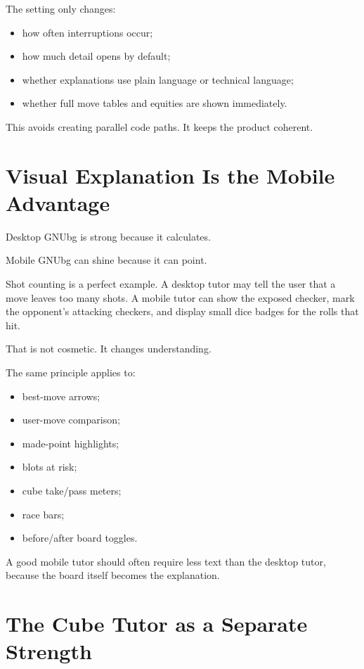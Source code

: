 \documentclass[11pt,a4paper]{article}
\begin{document}
The setting only changes:

\begin{itemize}
  \item how often interruptions occur;
  \item how much detail opens by default;
  \item whether explanations use plain language or technical language;
  \item whether full move tables and equities are shown immediately.
\end{itemize}

This avoids creating parallel code paths. It keeps the product coherent.

\section{Visual Explanation Is the Mobile Advantage}

Desktop GNUbg is strong because it calculates.

Mobile GNUbg can shine because it can point.

Shot counting is a perfect example. A desktop tutor may tell the user that a move leaves too many shots. A mobile tutor can show the exposed checker, mark the opponent's attacking checkers, and display small dice badges for the rolls that hit.

That is not cosmetic. It changes understanding.

The same principle applies to:

\begin{itemize}
  \item best-move arrows;
  \item user-move comparison;
  \item made-point highlights;
  \item blots at risk;
  \item cube take/pass meters;
  \item race bars;
  \item before/after board toggles.
\end{itemize}

A good mobile tutor should often require less text than the desktop tutor, because the board itself becomes the explanation.

\section{The Cube Tutor as a Separate Strength}
\end{document}
